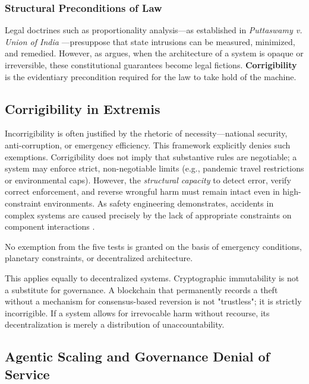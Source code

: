 \subsubsection{Structural Preconditions of Law}
Legal doctrines such as proportionality analysis---as established in \textit{Puttaswamy v. Union of India} \citep{puttaswamy2017}---presuppose that state intrusions can be measured, minimized, and remedied. However, as \citet{bhatia2019} argues, when the architecture of a system is opaque or irreversible, these constitutional guarantees become legal fictions. \textbf{Corrigibility} is the evidentiary precondition required for the law to take hold of the machine.

\subsection{Corrigibility in Extremis}

Incorrigibility is often justified by the rhetoric of necessity---national security, anti-corruption, or emergency efficiency. This framework explicitly denies such exemptions. Corrigibility does not imply that substantive rules are negotiable; a system may enforce strict, non-negotiable limits (e.g., pandemic travel restrictions or environmental caps). However, the \textit{structural capacity} to detect error, verify correct enforcement, and reverse wrongful harm must remain intact even in high-constraint environments. As safety engineering demonstrates, accidents in complex systems are caused precisely by the lack of appropriate constraints on component interactions \citep{leveson2011}.

\begin{claim}
No exemption from the five tests is granted on the basis of emergency conditions, planetary constraints, or decentralized architecture.
\end{claim}

This applies equally to decentralized systems. Cryptographic immutability is not a substitute for governance. A blockchain that permanently records a theft without a mechanism for consensus-based reversion is not "trustless"; it is strictly incorrigible. If a system allows for irrevocable harm without recourse, its decentralization is merely a distribution of unaccountability.

\subsection{Agentic Scaling and Governance Denial of Service}
\label{subsec:gdos}

